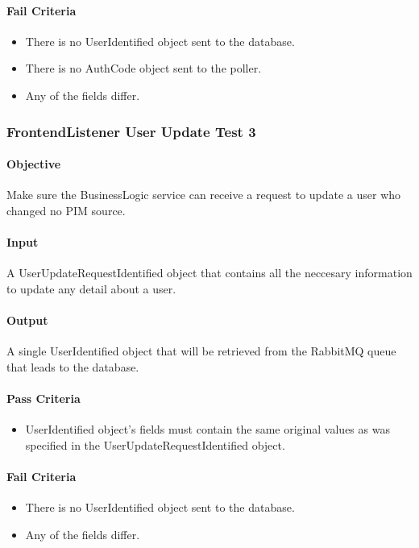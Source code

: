 \documentclass[hidelinks,english]{article}
\begin{document}
				\paragraph{Fail Criteria}
				\begin{itemize}
					\item There is no UserIdentified object sent to the database.
					\item There is no AuthCode object sent to the poller.
					\item Any of the fields differ.
				\end{itemize}
			
			\subsubsection{FrontendListener User Update Test 3}\label{businessfrontendlistenerupdatetest3}
				\paragraph{Objective} Make sure the BusinessLogic service can receive a request to update a user who changed no PIM source.
				\paragraph{Input} A UserUpdateRequestIdentified object that contains all the neccesary information to update any detail about a user.
				\paragraph{Output} A single UserIdentified object that will be retrieved from the RabbitMQ queue that leads to the database.
				\paragraph{Pass Criteria}
				\begin{itemize}
					\item UserIdentified object's fields must contain the same original values as was specified in the UserUpdateRequestIdentified object.
				\end{itemize}
				\paragraph{Fail Criteria}
				\begin{itemize}
					\item There is no UserIdentified object sent to the database.
					\item Any of the fields differ.
				\end{itemize}
				
\end{document}
